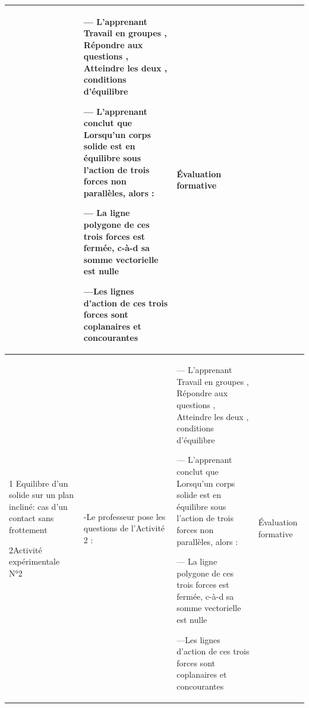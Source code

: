 \documentclass[12pt]{article}
\begin{document}
\begin{center}
\begin{tabular}{|p{}||p{}||p{}||p{}|}
				  &
				  --- L’apprenant Travail en groupes , Répondre aux
questions , Atteindre les deux
 , conditions d’équilibre

--- L’apprenant conclut que  Lorsqu’un corps solide est en équilibre sous l’action de trois forces non parallèles, alors :

\vspace{0.5cm}

--- La ligne polygone de ces trois forces est fermée, c-à-d sa somme vectorielle est nulle

---Les lignes d’action de ces trois forces sont coplanaires et concourantes

\vspace{0.2cm}
				  & 
	Évaluation formative \\\hline			  

\color{red}{III Application : méthode géométrique, méthode analytique }

\vspace{0.5cm}
\color{blue}1 Equilibre d’un solide sur un plan incliné: cas d’un contact sans frottement

\vspace{0.5cm}

\color{blue}2Activité expérimentale N°2
\vspace{0.5cm}


				  &
-Le professeur pose les questions de l'Activité 2 : 


				  &
				  --- L’apprenant Travail en groupes , Répondre aux
questions , Atteindre les deux
 , conditions d’équilibre

--- L’apprenant conclut que  Lorsqu’un corps solide est en équilibre sous l’action de trois forces non parallèles, alors :

\vspace{0.5cm}

--- La ligne polygone de ces trois forces est fermée, c-à-d sa somme vectorielle est nulle

---Les lignes d’action de ces trois forces sont coplanaires et concourantes

\vspace{0.2cm}
				  & 
	Évaluation formative \\\hline			  



\end{tabular}
\end{center}

\end{document}

